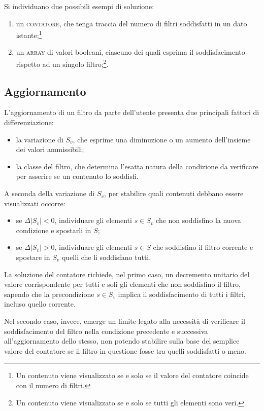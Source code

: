 Si individuano due possibili esempi di soluzione: 
\begin{enumerate}
  \item un \textsc{contatore}, che tenga traccia del numero di filtri soddisfatti in un dato istante;\footnote{Un contenuto viene visualizzato se e solo se il valore del contatore coincide con il numero di filtri.}
  \item un \textsc{array} di valori booleani, ciascuno dei quali esprima il soddisfacimento rispetto ad un singolo filtro;\footnote{Un contenuto viene visualizzato se e solo se tutti gli elementi sono veri.}.
\end{enumerate}

\subsection{Aggiornamento}
L'aggiornamento di un filtro da parte dell'utente presenta due principali fattori di differenziazione:
\begin{itemize}
\item la variazione di $S_v$, che esprime una diminuzione o un aumento dell'insieme dei valori ammissibili;
\item la classe del filtro, che determina l'esatta natura della condizione da verificare per asserire se un contenuto lo soddisfi.
\end{itemize}

A seconda della variazione di $S_v$, per stabilire quali contenuti debbano essere visualizzati occorre:
\begin{itemize}
  \item se $\Delta \left|S_v\right|<0$, individuare gli elementi $s \in S_v$ che non soddisfino la nuova condizione e spostarli in $S$;
  \item se $\Delta \left|S_v\right|>0$, individuare gli elementi $s \in S$ che soddisfino il filtro corrente e spostare in $S_v$ quelli che li soddisfano tutti.
\end{itemize}

La soluzione del contatore richiede, nel primo caso, un decremento unitario del valore corrispondente per tutti e soli gli elementi che non soddisfino il filtro, sapendo che la precondizione $s \in S_v$ implica il soddisfacimento di tutti i filtri, incluso quello corrente.

Nel secondo caso, invece, emerge un limite legato alla necessità di verificare il soddisfacimento del filtro nella condizione precedente e successiva all'aggiornamento dello stesso, non potendo stabilire sulla base del semplice valore del contatore se il filtro in questione fosse tra quelli soddisfatti o meno.

